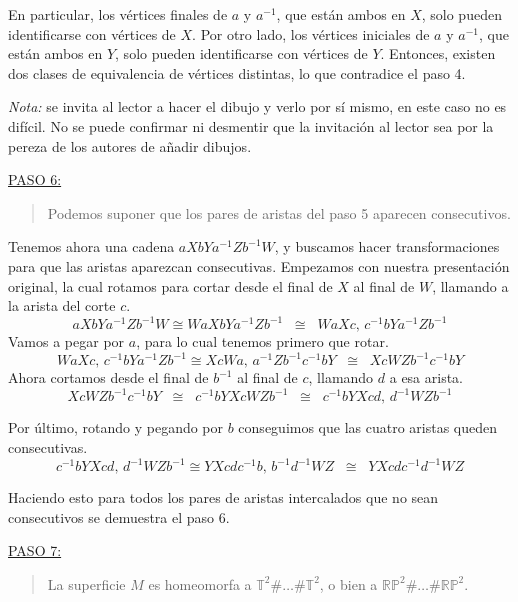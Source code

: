 {    \vspace{0.5em}
    \noindent
    En particular, los vértices finales de $a$ y $a^{-1}$, que están ambos en $X$, 
    solo pueden identificarse con vértices de $X$. 
    Por otro lado, los vértices iniciales de $a$ y $a^{-1}$, que están ambos en $Y$, 
    solo pueden identificarse con vértices de $Y$. 
    Entonces, existen dos clases de equivalencia de vértices distintas, 
    lo que contradice el paso 4.

    \vspace{0.5em}
    \noindent
    \textit{Nota:} se invita al lector a hacer el dibujo y verlo por sí mismo, en este caso no es difícil. No se puede confirmar ni desmentir que la invitación al lector sea por la pereza de los autores de añadir dibujos. 

    \vspace{1.3em}
    \noindent
    \underline{PASO 6:}
    \begin{quote}
        Podemos suponer que los pares de aristas del paso 5 aparecen consecutivos.
    \end{quote}

    \noindent
    Tenemos ahora una cadena $aXbYa^{-1}Zb^{-1}W$, 
    y buscamos hacer transformaciones para que las aristas aparezcan consecutivas. 
    Empezamos con nuestra presentación original, la cual rotamos para cortar desde el final de $X$ al final de $W$, llamando a la arista del corte $c$. 
    \[
        aXbYa^{-1}Zb^{-1}W \cong WaXbYa^{-1}Zb^{-1} \;\;\cong\;\; WaXc \text{, } c^{-1}bYa^{-1}Zb^{-1}
    \]
    \noindent 
    Vamos a pegar por $a$, para lo cual tenemos primero que rotar.
    \[
        WaXc \text{, } c^{-1}bYa^{-1}Zb^{-1} \cong XcWa \text{, } a^{-1}Zb^{-1}c^{-1}bY \;\;\cong\;\; XcWZb^{-1}c^{-1}bY
    \] 
    \noindent
    Ahora cortamos desde el final de $b^{-1}$ al final de $c$, llamando $d$ a esa arista. 
    \[
        XcWZb^{-1}c^{-1}bY \;\;\cong\;\; c^{-1}bYXcWZb^{-1} \;\;\cong\;\; c^{-1}bYXcd \text{, } d^{-1}WZb^{-1}
    \]

    \noindent
    Por último, rotando y pegando por $b$ conseguimos que las cuatro aristas queden consecutivas.
    \[
        c^{-1}bYXcd \text{, } d^{-1}WZb^{-1} \cong YXcdc^{-1}b \text{, } b^{-1}d^{-1}WZ \;\;\cong\;\; YXcdc^{-1}d^{-1}WZ
    \]

    \vspace{0.5em}
    \noindent
    Haciendo esto para todos los pares de aristas intercalados que no sean consecutivos se demuestra el paso 6.

    \vspace{1.3em}
    \noindent
    \underline{PASO 7:}
    \begin{quote}
        La superficie $M$ es homeomorfa a $\mathbb{T}^2\#\dots\#\mathbb{T}^2$, o bien a $\mathbb{RP}^2\#\dots\#\mathbb{RP}^2$.
    \end{quote}

}
